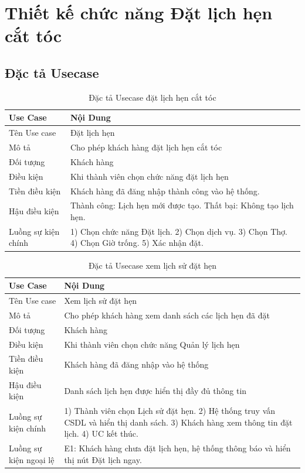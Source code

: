 \documentclass[../BTL.tex]{subfiles}
\begin{document}
\section{Thiết kế chức năng Đặt lịch hẹn cắt tóc}
\subsection{Đặc tả Usecase}
\begin{longtable}{|p{}|p{}|}
\caption{Đặc tả Usecase đặt lịch hẹn cắt tóc}\label{tab:usecase-dat-lich-hen}\\
\hline
\textbf{Use Case} & \textbf{Nội Dung} \\
\hline
Tên Use case & Đặt lịch hẹn \\
\hline
Mô tả & Cho phép khách hàng đặt lịch hẹn cắt tóc \\
\hline
Đối tượng & Khách hàng \\
\hline
Điều kiện & Khi thành viên chọn chức năng đặt lịch hẹn \\
\hline
Tiền điều kiện & Khách hàng đã đăng nhập thành công vào hệ thống. \\
\hline
Hậu điều kiện & Thành công: Lịch hẹn mới được tạo. Thất bại: Không tạo lịch hẹn. \\
\hline
Luồng sự kiện chính & 1) Chọn chức năng Đặt lịch. 2) Chọn dịch vụ. 3) Chọn Thợ. 4) Chọn Giờ trống. 5) Xác nhận đặt. \\
\hline
\end{longtable}

\begin{longtable}{|p{}|p{}|}
\caption{Đặc tả Usecase xem lịch sử đặt hẹn}\label{tab:usecase-xem-lich-su-dat-hen}\\
\hline
\textbf{Use Case} & \textbf{Nội Dung} \\
\hline
Tên Use case & Xem lịch sử đặt hẹn \\
\hline
Mô tả & Cho phép khách hàng xem danh sách các lịch hẹn đã đặt \\
\hline
Đối tượng & Khách hàng \\
\hline
Điều kiện & Khi thành viên chọn chức năng Quản lý lịch hẹn \\
\hline
Tiền điều kiện & Khách hàng đã đăng nhập vào hệ thống \\
\hline
Hậu điều kiện & Danh sách lịch hẹn được hiển thị đầy đủ thông tin \\
\hline
Luồng sự kiện chính & 1) Thành viên chọn Lịch sử đặt hẹn. 2) Hệ thống truy vấn CSDL và hiển thị danh sách. 3) Khách hàng xem thông tin đặt lịch. 4) UC kết thúc. \\
\hline
Luồng sự kiện ngoại lệ & E1: Khách hàng chưa đặt lịch hẹn, hệ thống thông báo và hiển thị nút Đặt lịch ngay. \\
\hline
\end{longtable}
\end{document}
